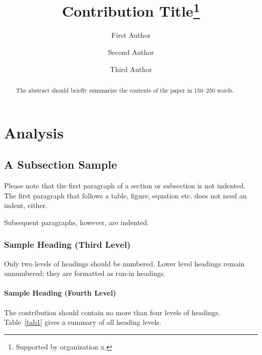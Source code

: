 \documentclass[runningheads]{llncs}
\begin{document}
%
\title{Contribution Title\thanks{Supported by organization x.}}
%
%
\author{First Author \and
Second Author \and
Third Author}
%
%
%
\maketitle              %
%
\begin{abstract}
The abstract should briefly summarize the contents of the paper in
150--250 words.

\end{abstract}
%
%
%
\section{Analysis}
\subsection{A Subsection Sample}
Please note that the first paragraph of a section or subsection is
not indented. The first paragraph that follows a table, figure,
equation etc. does not need an indent, either.

Subsequent paragraphs, however, are indented.

\subsubsection{Sample Heading (Third Level)} Only two levels of
headings should be numbered. Lower level headings remain unnumbered;
they are formatted as run-in headings.

\paragraph{Sample Heading (Fourth Level)}
The contribution should contain no more than four levels of
headings. Table~\ref{tab1} gives a summary of all heading levels.
\end{document}
